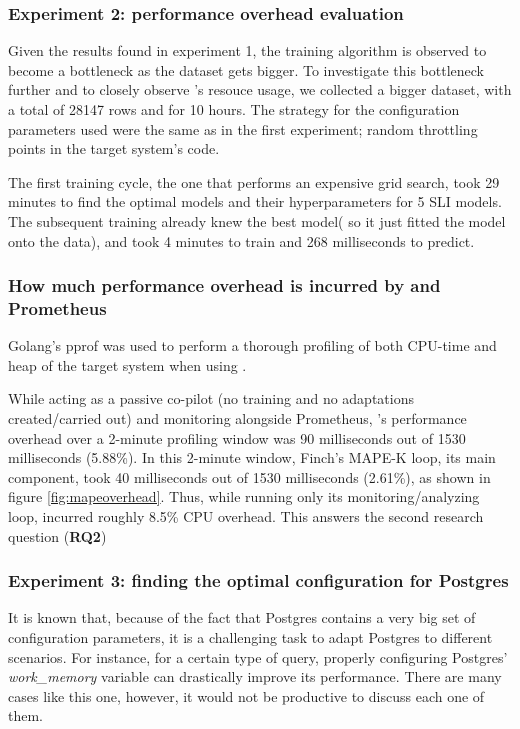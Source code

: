\subsubsection{Experiment 2: performance overhead evaluation}

Given the results found in experiment 1, the training algorithm is observed to become a bottleneck as the dataset gets bigger. To investigate this bottleneck further and to closely observe \projectname{}'s resouce usage, we collected a bigger dataset, with a total of 28147 rows and for 10 hours. The strategy for the configuration parameters used were the same as in the first experiment; random throttling points in the target system's code.

The first training cycle, the one that performs an expensive grid search, took 29 minutes to find the optimal models and their hyperparameters for 5 SLI models. The subsequent training already knew the best model( so it just fitted the model onto the data), and took 4 minutes to train and 268 milliseconds to predict.

\subsubsection{How much performance overhead is incurred by \projectname{} and Prometheus}

Golang's pprof was used to perform a thorough profiling of both CPU-time and heap of the target system when using \projectname{}.

While acting as a passive co-pilot (no training and no adaptations created/carried out) and monitoring alongside Prometheus, \projectname{}'s performance overhead over a 2-minute profiling window was 90 milliseconds out of 1530 milliseconds (5.88\%). In this 2-minute window, Finch's MAPE-K loop, its main component, took 40 milliseconds out of 1530 milliseconds (2.61\%), as shown in figure \ref{fig:mapeoverhead}. Thus, while running only its monitoring/analyzing loop, \projectname{} incurred roughly 8.5\% CPU overhead. This answers the second research question (\textbf{RQ2})


\subsubsection{Experiment 3: finding the optimal configuration for Postgres}

It is known that, because of the fact that Postgres contains a very big set of configuration parameters, it is a challenging task to adapt Postgres to different scenarios. For instance, for a certain type of query, properly configuring Postgres' \textit{work\_memory} variable can drastically improve its performance. There are many cases like this one, however, it would not be productive to discuss each one of them.

